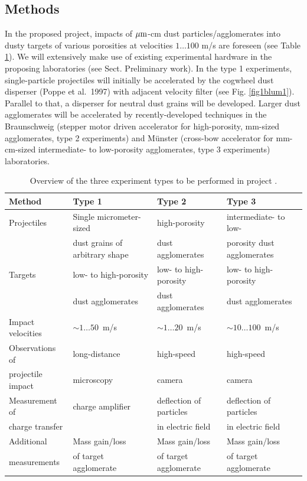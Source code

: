 \subsection{Methods}
In the proposed project, impacts of $\rm \mu m$-cm dust
particles/agglomerates into dusty targets of various porosities at
velocities $1 \ldots 100$ m/s are foreseen (see Table
\ref{tab1blum1}). We will extensively make use of existing
experimental hardware in the proposing laboratories (see Sect.
Preliminary work). In the type 1 experiments, single-particle
projectiles will initially be accelerated by the cogwheel dust
disperser (Poppe et al.~1997) with adjacent velocity filter (see
Fig. \ref{fig1blum1}). Parallel to that, a disperser for neutral
dust grains will be developed. Larger dust agglomerates will be
accelerated by recently-developed techniques in the Braunschweig
(stepper motor driven accelerator for high-porosity, mm-sized
agglomerates, type 2 experiments) and M\"unster (cross-bow
accelerator for mm-cm-sized intermediate- to low-porosity
agglomerates, type 3 experiments) laboratories.

\begin{table}[h]
\caption{\label{tab1blum1}Overview of the three experiment types
to be performed in project \projblum{}.}
{\footnotesize %
\begin{tabular}{|l||l|l|l|}
  \hline
  Method & Type 1 & Type 2 & Type 3\\
   \hline
   \hline
  Projectiles & Single micrometer-sized & high-porosity  & intermediate- to low- \\
  & dust grains of arbitrary shape & dust agglomerates & porosity dust agglomerates\\
  \hline
  Targets & low- to high-porosity & low- to high-porosity & low- to high-porosity\\
  & dust agglomerates & dust agglomerates & dust agglomerates\\
  \hline
  Impact velocities & $\sim 1 \ldots 50$~m/s & $\sim 1 \ldots 20$~m/s
  & $\sim 10 \ldots 100$~m/s\\
  \hline
  Observations of & long-distance & high-speed & high-speed \\
  projectile impact & microscopy & camera & camera \\
  \hline
  Measurement of & charge amplifier & deflection of particles &
  deflection of particles\\
  charge transfer & & in electric field & in electric field\\
  \hline
  Additional & Mass gain/loss & Mass gain/loss & Mass
  gain/loss\\
  measurements & of target agglomerate & of target agglomerate & of target
  agglomerate\\
  \hline
\end{tabular}
}
\end{table}

